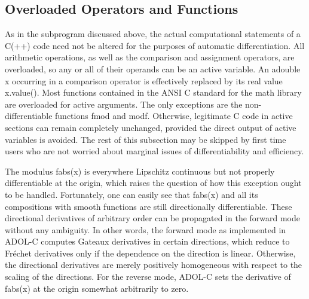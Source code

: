 \documentclass[11pt,twoside]{article}
\begin{document}
\subsection{Overloaded Operators and Functions}
\label{OverOper}
%
As in the subprogram discussed above, the actual computational
statements of a C(++) code need not be altered for the purposes of
automatic differentiation. All arithmetic operations, as well as the
comparison and assignment operators, are overloaded, so any or all of
their operands can be an active variable. An {\sf adouble x} occurring
in a comparison operator is effectively replaced by its real value
{\sf x.value()}. Most functions contained in the ANSI C standard for 
the math library are overloaded for active arguments. The only 
exceptions are the non-differentiable functions {\sf fmod} and 
{\sf modf}. Otherwise, legitimate C code in active sections can remain
completely unchanged, provided the direct output of active variables
is avoided. The rest of this subsection may be skipped by first time
users who are not worried about marginal issues of differentiability
and efficiency. 

The modulus {\sf fabs(x)} is everywhere Lipschitz continuous but not
properly differentiable at the origin, which raises the question of
how this exception ought to be handled. Fortunately, one can easily
see that {\sf fabs(x)} and all its compositions with smooth
functions are still directionally differentiable. These
directional derivatives of arbitrary order can be propagated in the
forward mode without any ambiguity. In other words, the forward mode as
implemented in ADOL-C  computes Gateaux derivatives
in certain directions, which reduce to Fr\'echet derivatives only
if the dependence on the direction is linear. Otherwise,
the directional derivatives are merely positively homogeneous with
respect to the scaling of the directions.
For the reverse mode, ADOL-C sets the derivative of {\sf fabs(x)} at
the origin somewhat arbitrarily to zero.
\end{document}
